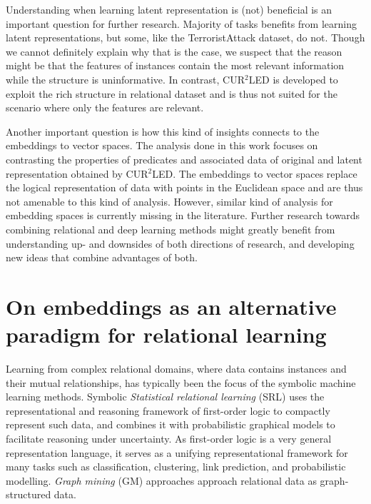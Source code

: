 Understanding when learning latent representation is (not) beneficial is an important question for further research.
Majority of tasks benefits from learning latent representations, but some, like the TerroristAttack dataset, do not.
Though we cannot definitely explain why that is the case, we suspect that the reason might be that the features of instances contain the most relevant information while the structure is uninformative.
In contrast, CUR$^2$LED is developed to exploit the rich structure in relational dataset and is thus not suited for the scenario where only the features are relevant.




Another important question is how this kind of insights connects to the embeddings to vector spaces.
The analysis done in this work focuses on contrasting the properties of predicates and associated data of original and latent representation obtained by CUR$^2$LED.
The embeddings to vector spaces replace the logical representation of data with points in the Euclidean space and are thus not amenable to this kind of analysis.
However, similar kind of analysis for embedding spaces is currently missing in the literature.
Further research towards combining relational and deep learning methods might greatly benefit from understanding up- and downsides of both directions of research, and developing new ideas that combine advantages of both.






\section{On embeddings as an alternative paradigm for relational learning}


Learning from complex relational domains, where data contains instances and their mutual relationships, has typically been the focus of the symbolic machine learning methods.
Symbolic \textit{Statistical relational learning} (SRL)  \cite{GetoorSRL,Raedt:2016:SRA:3027718} uses the representational and reasoning framework of first-order logic to compactly represent such data, and combines it with probabilistic graphical models to facilitate reasoning under uncertainty.
As first-order logic is a very general representation language, it serves as a unifying representational framework for many tasks such as classification, clustering, link prediction, and probabilistic modelling.
\textit{Graph mining} (GM) approaches  \cite{Chakrabarti:2006:GML:1132952.1132954} approach relational data as graph-structured data.




